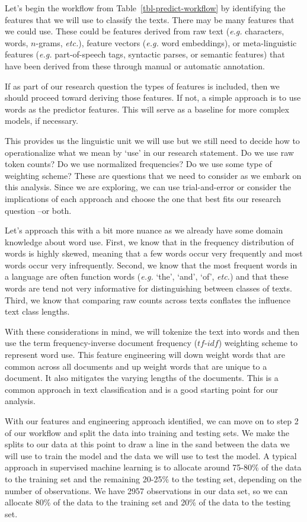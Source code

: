 \documentclass[
  letterpaper,
]{book}
\theoremstyle{definition}
\theoremstyle{remark}
\begin{document}
Let's begin the workflow from Table~\ref{tbl-predict-workflow} by
identifying the features that we will use to classify the texts. There
may be many features that we could use. These could be features derived
from raw text (\emph{e.g.} characters, words, \(n\)-grams, \emph{etc.}),
feature vectors (\emph{e.g.} word embeddings), or meta-linguistic
features (\emph{e.g.} part-of-speech tags, syntactic parses, or semantic
features) that have been derived from these through manual or automatic
annotation.

If as part of our research question the types of features is included,
then we should proceed toward deriving those features. If not, a simple
approach is to use words as the predictor features. This will serve as a
baseline for more complex models, if necessary.

This provides us the linguistic unit we will use but we still need to
decide how to operationalize what we mean by `use' in our research
statement. Do we use raw token counts? Do we use normalized frequencies?
Do we use some type of weighting scheme? These are questions that we
need to consider as we embark on this analysis. Since we are exploring,
we can use trial-and-error or consider the implications of each approach
and choose the one that best fits our research question --or both.

Let's approach this with a bit more nuance as we already have some
domain knowledge about word use. First, we know that in the frequency
distribution of words is highly skewed, meaning that a few words occur
very frequently and most words occur very infrequently. Second, we know
that the most frequent words in a language are often function words
(\emph{e.g.} `the', `and', `of', \emph{etc.}) and that these words are
tend not very informative for distinguishing between classes of texts.
Third, we know that comparing raw counts across texts conflates the
influence text class lengths.

With these considerations in mind, we will tokenize the text into words
and then use the term frequency-inverse document frequency
(\(tf\)-\(idf\)) weighting scheme to represent word use. This feature
engineering will down weight words that are common across all documents
and up weight words that are unique to a document. It also mitigates the
varying lengths of the documents. This is a common approach in text
classification and is a good starting point for our analysis.

With our features and engineering approach identified, we can move on to
step 2 of our workflow and split the data into training and testing
sets. We make the splits to our data at this point to draw a line in the
sand between the data we will use to train the model and the data we
will use to test the model. A typical approach in supervised machine
learning is to allocate around 75-80\% of the data to the training set
and the remaining 20-25\% to the testing set, depending on the number of
observations. We have 2957 observations in our data set, so we can
allocate 80\% of the data to the training set and 20\% of the data to
the testing set.
\end{document}
